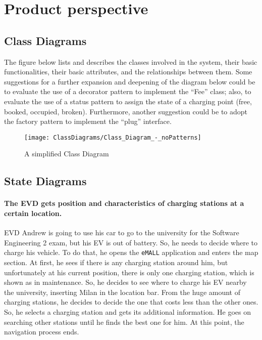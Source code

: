 \section{Product perspective}
\label{sec:product_perspective}%

\subsection{Class Diagrams}
\label{subsec:class_diagrams}%
The figure below lists and describes the classes involved in the system, their basic functionalities, their basic attributes,
and the relationships between them.
Some suggestions for a further expansion and deepening of the diagram below could be to evaluate the use of a decorator
pattern to implement the ``Fee'' class;
also, to evaluate the use of a status pattern to assign the state of a charging point (free, booked, occupied, broken).
Furthermore, another suggestion could be to adopt the factory pattern to implement the ``plug'' interface.
\begin{figure}[H]
    \begin{center}
        \texttt{[image: ClassDiagrams/Class\_Diagram\_-\_noPatterns]}
        \caption{A simplified Class Diagram}
        \label{fig:class_diagram}%
    \end{center}
\end{figure}

\subsection{State Diagrams}
\label{subsec:state_diagrams}%

\paragraph{The EVD gets position and characteristics of charging stations at a certain location.}
EVD Andrew is going to use his car to go to the university for the Software Engineering 2 exam, but his EV is out of battery.
So, he needs to decide where to charge his vehicle.
To do that, he opens the \verb|eMALL| application and enters the map section.
At first, he sees if there is any charging station around him, but unfortunately at his current position,
there is only one charging station, which is shown as in maintenance.
So, he decides to see where to charge his EV nearby the university, inserting Milan in the location bar.
From the huge amount of charging stations, he decides to decide the one that costs less than the other ones.
So, he selects a charging station and gets its additional information.
He goes on searching other stations until he finds the best one for him.
At this point, the navigation process ends.

